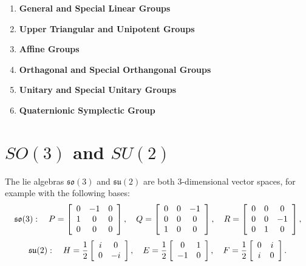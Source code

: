 \begin{enumerate}
  \item {\bf General and Special Linear Groups}

  \item {\bf Upper Triangular and Unipotent Groups}

  \item {\bf Affine Groups}

  \item {\bf Orthagonal and Special Orthangonal Groups}

  \item {\bf Unitary and Special Unitary Groups}

  \item {\bf Quaternionic Symplectic Group}

\end{enumerate}

\section{\(SO(3)\) and \(SU(2)\)}

The lie algebras \(\mathfrak{so}(3)\) and \(\mathfrak{su}(2)\) are both 3-dimensional
vector spaces, for example with the following bases:
\[ \mathfrak{so}(3):\hspace{10px}
  P=
  \left[\begin{array}{ccc}
      0 & -1 & 0 \\
      1 & 0 & 0 \\
      0 & 0 & 0
  \end{array}\right],\hspace{10px}
  Q=
  \left[\begin{array}{ccc}
      0 & 0 & -1 \\
      0 & 0 & 0 \\
      1 & 0 & 0
  \end{array}\right],\hspace{10px}
  R=
  \left[\begin{array}{ccc}
      0 & 0 & 0 \\
      0 & 0 & -1 \\
      0 & 1 & 0
  \end{array}\right],
\]
\[ \mathfrak{su}(2):\hspace{10px}
  H=\frac{1}{2}
  \left[\begin{array}{cc}
      i & 0 \\
      0 & -i
  \end{array}\right],\hspace{10px}
  E=\frac{1}{2}
  \left[\begin{array}{cc}
      0 & 1 \\
      -1 & 0
  \end{array}\right],\hspace{10px}
  F=\frac{1}{2}
  \left[\begin{array}{cc}
      0 & i \\
      i & 0
  \end{array}\right].
\]


